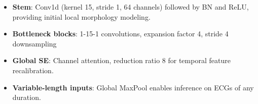 \documentclass[a0paper,portrait]{baposter}
\begin{document}
\begin{poster}
{\vspace{-2ex}

\begin{itemize}
\item {\bf Stem}: Conv1d (kernel 15, stride 1, 64 channels) followed by BN and ReLU, providing initial local morphology modeling.
\item {\bf Bottleneck blocks}: 1-15-1 convolutions, expansion factor 4, stride 4 downsampling
\item {\bf Global SE}: Channel attention, reduction ratio 8 for temporal feature recalibration.
\item {\bf Variable-length inputs}: Global MaxPool enables inference on ECGs of any duration.
\end{itemize}

}





\end{poster}
\end{document}
